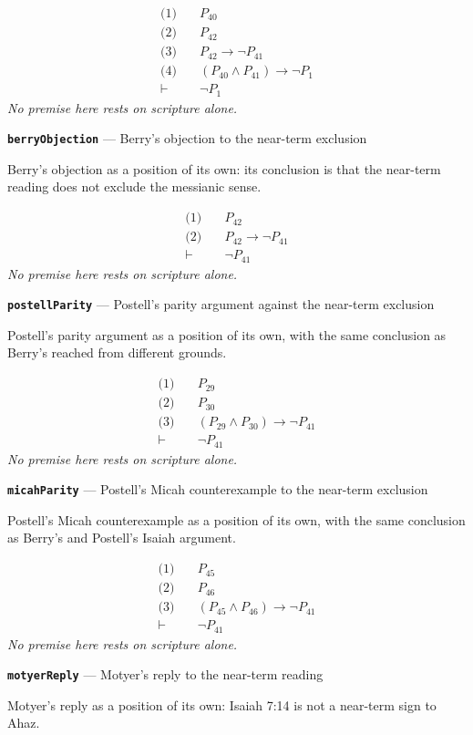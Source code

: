 \documentclass[11pt]{article}
\begin{document}
\begin{align*}
  \text{(1)} \quad & P_{40} \\
  \text{(2)} \quad & P_{42} \\
  \text{(3)} \quad & P_{42} \rightarrow \lnot P_{41} \\
  \text{(4)} \quad & (P_{40} \land P_{41}) \rightarrow \lnot P_{1} \\
  \vdash \quad & \lnot P_{1}
\end{align*}
\emph{No premise here rests on scripture alone.}
\par\medskip\noindent\textbf{\texttt{berry\allowbreak{}Objection}} --- Berry's objection to the near-term exclusion\par\nobreak\noindent
Berry's objection as a position of its own: its conclusion is that the near-term reading does not exclude the messianic sense.

\begin{align*}
  \text{(1)} \quad & P_{42} \\
  \text{(2)} \quad & P_{42} \rightarrow \lnot P_{41} \\
  \vdash \quad & \lnot P_{41}
\end{align*}
\emph{No premise here rests on scripture alone.}
\par\medskip\noindent\textbf{\texttt{postell\allowbreak{}Parity}} --- Postell's parity argument against the near-term exclusion\par\nobreak\noindent
Postell's parity argument as a position of its own, with the same conclusion as Berry's reached from different grounds.

\begin{align*}
  \text{(1)} \quad & P_{29} \\
  \text{(2)} \quad & P_{30} \\
  \text{(3)} \quad & (P_{29} \land P_{30}) \rightarrow \lnot P_{41} \\
  \vdash \quad & \lnot P_{41}
\end{align*}
\emph{No premise here rests on scripture alone.}
\par\medskip\noindent\textbf{\texttt{micah\allowbreak{}Parity}} --- Postell's Micah counterexample to the near-term exclusion\par\nobreak\noindent
Postell's Micah counterexample as a position of its own, with the same conclusion as Berry's and Postell's Isaiah argument.

\begin{align*}
  \text{(1)} \quad & P_{45} \\
  \text{(2)} \quad & P_{46} \\
  \text{(3)} \quad & (P_{45} \land P_{46}) \rightarrow \lnot P_{41} \\
  \vdash \quad & \lnot P_{41}
\end{align*}
\emph{No premise here rests on scripture alone.}
\par\medskip\noindent\textbf{\texttt{motyer\allowbreak{}Reply}} --- Motyer's reply to the near-term reading\par\nobreak\noindent
Motyer's reply as a position of its own: Isaiah 7:14 is not a near-term sign to Ahaz.
\end{document}
